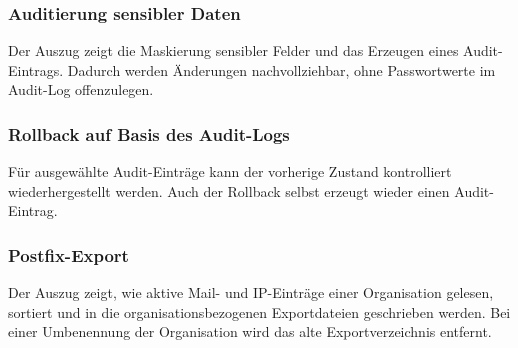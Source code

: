 \subsubsection*{Auditierung sensibler Daten}
Der Auszug zeigt die Maskierung sensibler Felder und das Erzeugen eines
Audit-Eintrags. Dadurch werden Änderungen nachvollziehbar, ohne Passwortwerte
im Audit-Log offenzulegen.




\clearpage

\subsubsection*{Rollback auf Basis des Audit-Logs}
Für ausgewählte Audit-Einträge kann der vorherige Zustand kontrolliert
wiederhergestellt werden. Auch der Rollback selbst erzeugt wieder einen
Audit-Eintrag.


\clearpage

\subsubsection*{Postfix-Export}
Der Auszug zeigt, wie aktive Mail- und IP-Einträge einer Organisation gelesen,
sortiert und in die organisationsbezogenen Exportdateien geschrieben werden.
Bei einer Umbenennung der Organisation wird das alte Exportverzeichnis entfernt.


